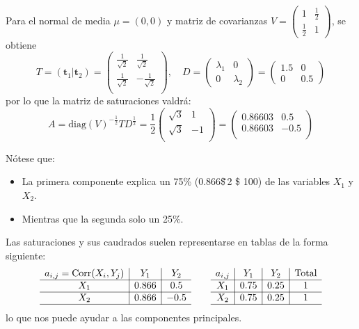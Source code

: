 Para el \vea normal de media $\mu=(0,0)$ y matriz de covarianzas $V=\begin{pmatrix}
	1 & \tfrac{1}{2}\\
	\tfrac{1}{2} & 1
\end{pmatrix}$, se obtiene \[ T=(\mathbf{t}_1|\mathbf{t}_2)=\begin{pmatrix}
\frac{1}{\sqrt{2}} & \frac{1}{\sqrt{2}}\\
\frac{1}{\sqrt{2}} & -\frac{1}{\sqrt{2}}\\
\end{pmatrix},\quad D=\begin{pmatrix}
\lambda_1 & 0\\
0 & \lambda_2
\end{pmatrix}=\begin{pmatrix}
1.5 & 0\\
0 & 0.5
\end{pmatrix} \]por lo que la matriz de saturaciones valdrá: \[ A=\mathrm{diag}(V)^{-\frac{1}{2}}TD^{\frac{1}{2}}=\dfrac{1}{2}\begin{pmatrix}
\sqrt{3} & 1\\
\sqrt{3} & -1\\
\end{pmatrix}=\begin{pmatrix}
0.86603 & 0.5\\
0.86603 & -0.5\\
\end{pmatrix} \]

Nótese que:
\begin{itemize}
	\item La primera componente explica un 75\% (0.866\$\^\,2 \$ 100) de las variables $X_1$ y $X_2$.
	\item Mientras que la segunda solo un 25\%.
\end{itemize}
Las saturaciones y sus caudrados suelen representarse en tablas de la forma siguiente:
\[ \begin{array}{c|c|c}
	a_{i,j}=\operatorname{Corr}(X_i,Y_j) & Y_1 & Y_2\\ \hline
	X_1 & 0.866 & 0.5\\ \hline
	X_2 & 0.866 & -0.5\\ \hline
\end{array}\qquad\begin{array}{c|c|c|c}
a_{i,j} & Y_1 & Y_2 & \text{Total}\\ \hline
X_1 & 0.75 & 0.25 & 1\\ \hline
X_2 & 0.75 & 0.25 & 1\\ \hline
\end{array} \] lo que nos puede ayudar a  las componentes principales.

